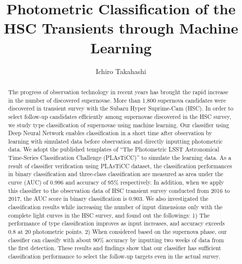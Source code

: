 \documentclass[useamsfonts]{pasj01}
\begin{document}
\title{Photometric Classification of the HSC Transients through Machine Learning}
\author{Ichiro Takahashi}%


\maketitle
%

\begin{abstract}
The progress of observation technology in recent years has brought the rapid increase in the number of discovered supernovae. More than 1,800 supernova candidates were discovered in transient survey with the Subaru Hyper Suprime-Cam (HSC). In order to select follow-up candidates efficiently among supernovae discovered in the HSC survey, we study type classification of supernovae using machine learning. Our classifier using Deep Neural Network enables classification in a short time after observation by learning with simulated data before observation and directly inputting photometric data. We adopt the published templates of “The Photometric LSST Astronomical Time-Series Classification Challenge (PLAsTiCC)” to simulate the learning data. As a result of classifier verification using PLAsTiCC dataset, the classification performances in binary classification and three-class classification are measured as area under the curve (AUC) of 0.996 and accuracy of 95\% respectively. In addition, when we apply this classifier to the observation data of HSC transient survey conducted from 2016 to 2017, the AUC score in binary classification is 0.903. We also investigated the classification results while increasing the number of input dimensions only with the complete light curves in the HSC survey, and found out the followings: 1) The performance of type classification improves as input increases, and accuracy exceeds 0.8 at 20 photometric points. 2) When considered based on the supernova phase, our classifier can classify with about 90\% accuracy by inputting two weeks of data from the first detection. These results and findings show that our classifier has sufficient classification performance to select the follow-up targets even in the actual survey.
\end{abstract}
\end{document}
